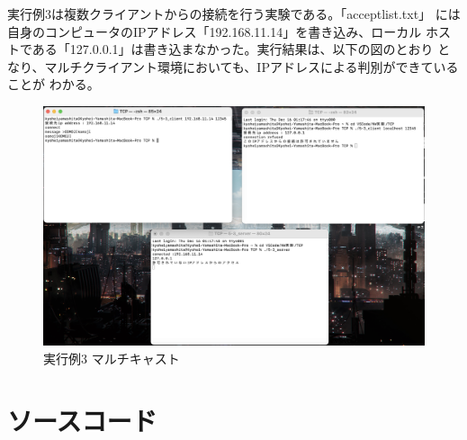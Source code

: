 \documentclass[dvipdfmx,autodetect-engine,titlepage]{jsarticle}
\begin{document}
  実行例3は複数クライアントからの接続を行う実験である。「acceptlist.txt」
  には自身のコンピュータのIPアドレス「192.168.11.14」を書き込み、ローカル
  ホストである「127.0.0.1」は書き込まなかった。実行結果は、以下の図のとおり
  となり、マルチクライアント環境においても、IPアドレスによる判別ができていることが
  わかる。
  \begin{figure}[h]
    \centering
    \includegraphics[scale=0.2]{pic10.png}
    \caption{実行例3 マルチキャスト}
  \end{figure}

\section{ソースコード}
\end{document}
